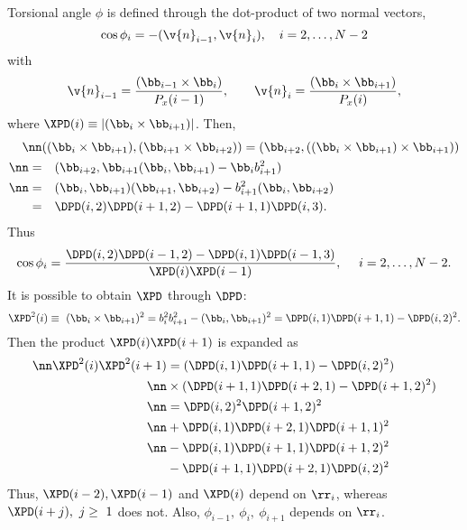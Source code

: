 Torsional angle $\phi$ is defined through the dot-product of two normal vectors,
\begin{equation}
  \cos\phi_{i}=-(\v{n}_{i-1},\v{n}_{i}),\quad i=2,\ldots,N-2
\end{equation}
with
\begin{equation}
  \v{n}_{i-1}=\frac{(\bb_{i-1}\times\bb_{i})}{P_x(i-1)},\qquad
  \v{n}_{i}=\frac{(\bb_{i}\times\bb_{i+1})}{P_x(i)},
\end{equation}
where $\XPD(i)\equiv|(\bb_i\times\bb_{i+1})|$.
Then,
\begin{align}
\nn&((\bb_i\times\bb_{i+1}),(\bb_{i+1}\times\bb_{i+2}))=
(\bb_{i+2},((\bb_i\times\bb_{i+1})\times\bb_{i+1}))\\
\nn=&\quad(\bb_{i+2},\bb_{i+1}(\bb_i,\bb_{i+1})-\bb_ib_{i+1}^2)\\
\nn=&\quad(\bb_i,\bb_{i+1})(\bb_{i+1},\bb_{i+2})-b_{i+1}^2(\bb_i,\bb_{i+2})\\
=&\quad\DPD(i,2)\DPD(i+1,2)-\DPD(i+1,1)\DPD(i,3).
\end{align}
Thus
\begin{equation}
  \cos\phi_{i}=\frac{\DPD(i,2)\DPD(i-1,2)-\DPD(i,1)\DPD(i-1,3)}{\XPD(i)\XPD(i-1)},
  \quad\ i=2,\ldots,N-2.
  \label{bln-def-tangle}
\end{equation}
It is possible to obtain $\XPD$ through $\DPD$:
\begin{equation}
  \XPD^2(i)\equiv\ (\bb_i\times\bb_{i+1})^2
  =b_i^2b_{i+1}^2-(\bb_i,\bb_{i+1})^2
  =\DPD(i,1)\DPD(i+1,1)-\DPD(i,2)^2.
\end{equation}
Then the product $\XPD(i)\XPD(i+1)$ is expanded as
\begin{align}
  \nn\XPD^2(i)\XPD^2(i+1)&={(\DPD(i,1)\DPD(i+1,1)-\DPD(i,2)^2)}\\
  \nn&\times{(\DPD(i+1,1)\DPD(i+2,1)-\DPD(i+1,2)^2)}\\
  \nn&=\DPD(i,2)^2\DPD(i+1,2)^2\\
  \nn&+\DPD(i,1)\DPD(i+2,1)\DPD(i+1,1)^2\\
  \nn&-\DPD(i,1)\DPD(i+1,1)\DPD(i+1,2)^2\\
  &-\DPD(i+1,1)\DPD(i+2,1)\DPD(i,2)^2
\end{align}
Thus, $\XPD(i-2),\XPD(i-1)$ and $\XPD(i)$ depend on $\rr_i$, 
whereas $\XPD(i+j),\ j\ge\ 1$ does not. 
Also, $\phi_{i-1},\ \phi_i,\ \phi_{i+1}$ depends on $\rr_i$. 
